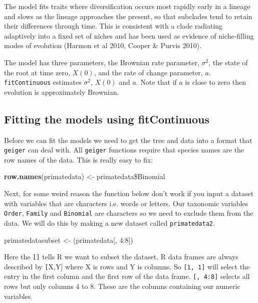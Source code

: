 \documentclass[11pt]{article}
\newcommand{\KeywordTok}[1]{\textcolor[rgb]{0.13,0.29,0.53}{\textbf{{#1}}}}
\newcommand{\DecValTok}[1]{\textcolor[rgb]{0.00,0.00,0.81}{{#1}}}
\newcommand{\StringTok}[1]{\textcolor[rgb]{0.31,0.60,0.02}{{#1}}}
\newcommand{\NormalTok}[1]{{#1}}
\begin{document}
The model fits traits where diversification occurs most rapidly early in a lineage and slows as the lineage approaches the present, so that subclades tend to retain their differences through time. This is consistent with a clade radiating adaptively into a fixed set of niches and has been used as evidence of niche-filling modes of evolution (Harmon et al 2010, Cooper \& Purvis 2010).

The model has three parameters, the Brownian rate parameter, $\sigma^2$, the state of the root at time zero, $X(0)$, and the rate of change parameter, $a$. \texttt{fitContinuous} estimates $\sigma^2$, $X(0)$ and $a$. Note that if $a$ is close to zero then evolution is approximately Brownian.

\subsection{Fitting the models using fitContinuous}

Before we can fit the models we need to get the tree and data into a format that \texttt{geiger} can deal with. All \texttt{geiger} functions require that species names are the row names of the data. This is really easy to fix:

\begin{snugshade}
\begin{Highlighting}[]
\KeywordTok{row.names}\NormalTok{(primatedata) <-}\StringTok{ }\NormalTok{primatedata\$Binomial}
\end{Highlighting}
\end{snugshade}

Next, for some weird reason the function below don't work if you input a dataset with variables that are characters i.e. words or letters. Our taxonomic variables \texttt{Order}, \texttt{Family} and \texttt{Binomial} are characters so we need to exclude them from the data. We will do this by making a new dataset called \texttt{primatedata2}.

\begin{snugshade}
\begin{Highlighting}[]
\NormalTok{primatedatasubset <-}\StringTok{ }\NormalTok{(primatedata[,} \DecValTok{4:8}\NormalTok{])}
\end{Highlighting}
\end{snugshade}

Here the \texttt{[]} tells R we want to subset the dataset. R data frames are always described by \texttt[X,Y] where X is rows and Y is columns. So \texttt{[1, 1]} will select the entry in the first column and the first row of the data frame. \texttt{[, 4:8]} selects all rows but only columns 4 to 8. These are the columns containing our numeric variables.
\end{document}
